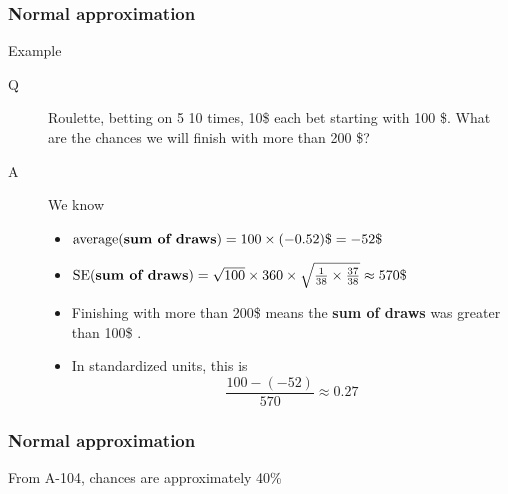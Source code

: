 \documentclass[handout]{beamer}
\begin{document}
   \begin{frame} \frametitle{Normal approximation}

   \begin{block}
   {Example}
   \begin{description}
   \item[Q] Roulette, betting on {\color{red} 5} 10 times, 10\$ each bet starting with 100 \$.
     What are the chances we will finish with more than 200 \$?
   \item[A] We know
     \begin{itemize}
     \item $\text{average({\bf sum of draws})} = 100 \times (-0.52)\$ = -52\$ $
     \item $\text{SE({\bf sum of draws})} = \sqrt{100} \times 360 \times \sqrt{\frac{1}{38} \times \frac{37}{38}} \approx 570\$ $
     \item Finishing with more than 200\$ means the {\bf sum of draws} was greater than 100\$ .
       \item In standardized units, this is
       $$
       \frac{100-(-52)}{570} \approx 0.27
       $$
     \end{itemize}
   \end{description}
   \end{block}
   \end{frame}



   \begin{frame}
   \frametitle{Normal approximation}
   \begin{center}
   \end{center}
   From A-104, chances are approximately 40\%
   \end{frame}
\end{document}
